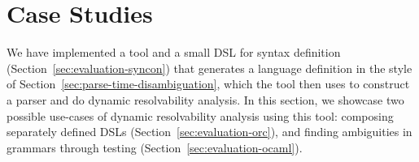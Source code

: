 \documentclass[runningheads]{llncs}
\newcommand{\parse}{\mathit{parse}} %
\newcommand{\words}{\mathit{words}} %
\newcommand{\alt}{\mathit{alt}} %
\newcommand{\basic}{\mathit{basic}} %
\begin{document}





\section{Case Studies} \label{sec:evaluation}

We have implemented a tool and a small DSL for syntax definition
(Section~\ref{sec:evaluation-syncon}) that generates a language
definition in the style of
Section~\ref{sec:parse-time-disambiguation}, which the tool then
uses to construct a parser and do dynamic resolvability analysis.
%
In this section, we showcase two possible use-cases of dynamic
resolvability analysis using this tool: composing separately
defined DSLs (Section~\ref{sec:evaluation-orc}), and finding
ambiguities in grammars through testing
(Section~\ref{sec:evaluation-ocaml}).
\end{document}
